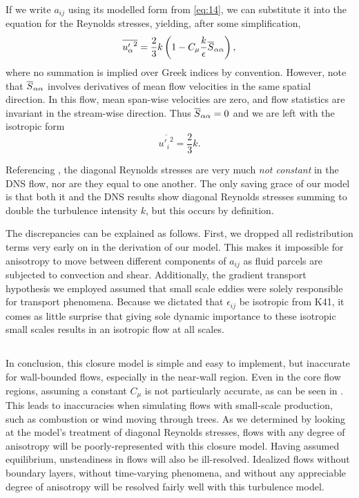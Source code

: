 \documentclass[11pt]{article}
\begin{document}
If we write $a_{ij}$ using its modelled form from \eqref{eq:14}, we can substitute it into the equation for the Reynolds stresses, yielding, after some simplification,
\begin{equation}
\overline{{u'_\alpha}^2} =
\frac{2}{3}k
\left(
1 - C_\mu \frac{k}{\epsilon} \overline{S}_{\alpha \alpha}
\right)
,
\end{equation}
where no summation is implied over Greek indices by convention. However, note that $\overline{S}_{\alpha\alpha}$ involves derivatives of mean flow velocities in the same spatial direction. In this flow, mean span-wise velocities are zero, and flow statistics are invariant in the stream-wise direction. Thus $\overline{S}_{\alpha\alpha} = 0$ and we are left with the isotropic form
\begin{equation}
\overline{{u'_i}^2} = \frac{2}{3} k
.
\end{equation}

Referencing , the diagonal Reynolds stresses are very much \emph{not constant} in the DNS flow, nor are they equal to one another. The only saving grace of our model is that both it and the DNS results show diagonal Reynolds stresses summing to double the turbulence intensity $k$, but this occurs by definition.

The discrepancies can be explained as follows. First, we dropped all redistribution terms very early on in the derivation of our model. This makes it impossible for anisotropy to move between different components of $a_{ij}$ as fluid parcels are subjected to convection and shear. Additionally, the gradient transport hypothesis we employed assumed that small scale eddies were solely responsible for transport phenomena. Because we dictated that $\epsilon_{ij}$ be isotropic from K41, it comes as little surprise that giving sole dynamic importance to these isotropic small scales results in an isotropic flow at all scales.

\subsection{}

In conclusion, this closure model is simple and easy to implement, but inaccurate for wall-bounded flows, especially in the near-wall region. Even in the core flow regions, assuming a constant $C_\mu$ is not particularly accurate, as can be seen in . This leads to inaccuracies when simulating flows with small-scale production, such as combustion or wind moving through trees. As we determined by looking at the model's treatment of diagonal Reynolds stresses, flows with any degree of anisotropy will be poorly-represented with this closure model. Having assumed equilibrium, unsteadiness in flows will also be ill-resolved. Idealized flows without boundary layers, without time-varying phenomena, and without any appreciable degree of anisotropy will be resolved fairly well with this turbulence model.
\end{document}
